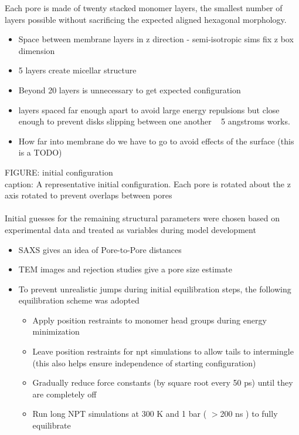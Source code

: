 \documentclass{article}
\begin{document}
	Each pore is made of twenty stacked monomer layers, the smallest number of layers possible without sacrificing the expected aligned hexagonal morphology.
	\begin{itemize}
		\item Space between membrane layers in z direction - semi-isotropic sims fix z box dimension
		\item 5 layers create micellar structure
		\item Beyond 20 layers is unnecessary to get expected configuration
		\item layers spaced far enough apart to avoid large energy repulsions but close enough to prevent disks slipping between one another ~ 5 angstroms works.
		\item How far into membrane do we have to go to avoid effects of the surface (this is a TODO)
	\end{itemize}
	FIGURE: initial configuration \\
	caption: A representative initial configuration. Each pore is rotated about the z axis rotated to prevent overlaps between pores \\
	\\
	\noindent Initial guesses for the remaining structural parameters were chosen based on experimental data and treated as variables during model development 
	\begin{itemize}
		\item SAXS gives an idea of Pore-to-Pore distances
		\item TEM images and rejection studies give a pore size estimate
		\item To prevent unrealistic jumps during initial equilibration steps, the following equilibration scheme was adopted
			\begin{itemize}
			\item Apply position restraints to monomer head groups during energy minimization 
			\item Leave position restraints for npt simulations to allow tails to intermingle (this also helps ensure independence of starting configuration)
			\item Gradually reduce force constants (by square root every 50 ps) until they are completely off
			\item Run long NPT simulations at 300 K and 1 bar ( $>$200 ns ) to fully equilibrate
			\end{itemize}
	\end{itemize}
	
\end{document}
